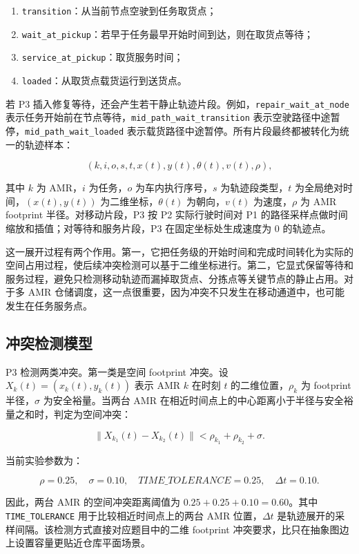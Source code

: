 \begin{enumerate}
  \item \verb|transition|：从当前节点空驶到任务取货点；
  \item \verb|wait_at_pickup|：若早于任务最早开始时间到达，则在取货点等待；
  \item \verb|service_at_pickup|：取货服务时间；
  \item \verb|loaded|：从取货点载货运行到送货点。
\end{enumerate}

若 P3 插入修复等待，还会产生若干静止轨迹片段。例如，\verb|repair_wait_at_node| 表示任务开始前在节点等待，\verb|mid_path_wait_transition| 表示空驶路径中途暂停，\verb|mid_path_wait_loaded| 表示载货路径中途暂停。所有片段最终都被转化为统一的轨迹样本：

\[
(k,i,o,s,t,x(t),y(t),\theta(t),v(t),\rho),
\]

其中 $k$ 为 AMR，$i$ 为任务，$o$ 为车内执行序号，$s$ 为轨迹段类型，$t$ 为全局绝对时间，$(x(t),y(t))$ 为二维坐标，$\theta(t)$ 为朝向，$v(t)$ 为速度，$\rho$ 为 AMR footprint 半径。对移动片段，P3 按 P2 实际行驶时间对 P1 的路径采样点做时间缩放和插值；对等待和服务片段，P3 在固定坐标处生成速度为 0 的轨迹点。

这一展开过程有两个作用。第一，它把任务级的开始时间和完成时间转化为实际的空间占用过程，使后续冲突检测可以基于二维坐标进行。第二，它显式保留等待和服务过程，避免只检测移动轨迹而漏掉取货点、分拣点等关键节点的静止占用。对于多 AMR 仓储调度，这一点很重要，因为冲突不只发生在移动通道中，也可能发生在任务服务点。

\subsection{冲突检测模型}

P3 检测两类冲突。第一类是空间 footprint 冲突。设 $X_k(t)=(x_k(t),y_k(t))$ 表示 AMR $k$ 在时刻 $t$ 的二维位置，$\rho_k$ 为 footprint 半径，$\sigma$ 为安全裕量。当两台 AMR 在相近时间点上的中心距离小于半径与安全裕量之和时，判定为空间冲突：

\[
\|X_{k_1}(t)-X_{k_2}(t)\|<
\rho_{k_1}+\rho_{k_2}+\sigma.
\]

当前实验参数为：

\[
\rho=0.25,\quad \sigma=0.10,\quad
TIME\_TOLERANCE=0.25,\quad \Delta t=0.10.
\]

因此，两台 AMR 的空间冲突距离阈值为 $0.25+0.25+0.10=0.60$。其中 \verb|TIME_TOLERANCE| 用于比较相近时间点上的两台 AMR 位置，$\Delta t$ 是轨迹展开的采样间隔。该检测方式直接对应题目中的二维 footprint 冲突要求，比只在抽象图边上设置容量更贴近仓库平面场景。

